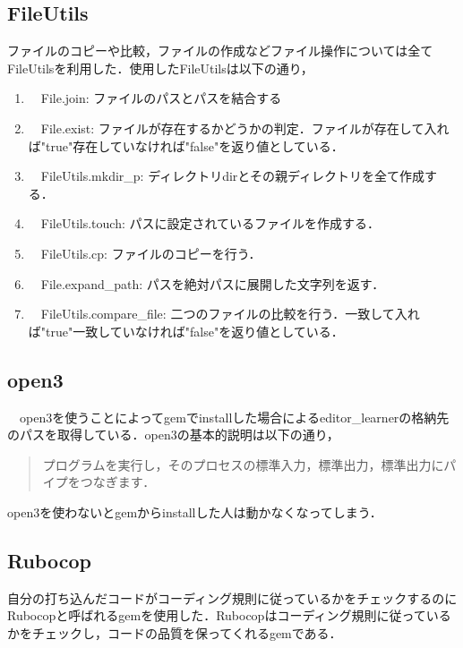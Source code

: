     \subsection{FileUtils}\label{fileutils}

ファイルのコピーや比較，ファイルの作成などファイル操作については全てFileUtilsを利用した．使用したFileUtilsは以下の通り，

\begin{enumerate}
\def\labelenumi{\arabic{enumi}.}
\tightlist
\item
　File.join: ファイルのパスとパスを結合する
\item
　File.exist: ファイルが存在するかどうかの判定．ファイルが存在して入れば"true"存在していなければ"false"を返り値としている．
\item
　FileUtils.mkdir\_p: ディレクトリdirとその親ディレクトリを全て作成する．
\item
　FileUtils.touch: パスに設定されているファイルを作成する．
\item
　FileUtils.cp: ファイルのコピーを行う．
\item
　File.expand\_path: パスを絶対パスに展開した文字列を返す．
\item
　FileUtils.compare\_file: 二つのファイルの比較を行う．一致して入れば"true"一致していなければ"false"を返り値としている．
\end{enumerate}


    \subsection{open3}\label{open3}

　open3を使うことによってgemでinstallした場合によるeditor\_learnerの格納先のパスを取得している．open3の基本的説明は以下の通り，
\begin{quotation}
プログラムを実行し，そのプロセスの標準入力，標準出力，標準出力にパイプをつなぎます． \cite{open3}
\end{quotation}
open3を使わないとgemからinstallした人は動かなくなってしまう．


    \subsection{Rubocop}\label{rubocop}

自分の打ち込んだコードがコーディング規則に従っているかをチェックするのにRubocopと呼ばれるgemを使用した．Rubocopはコーディング規則に従っているかをチェックし，コードの品質を保ってくれるgemである．
